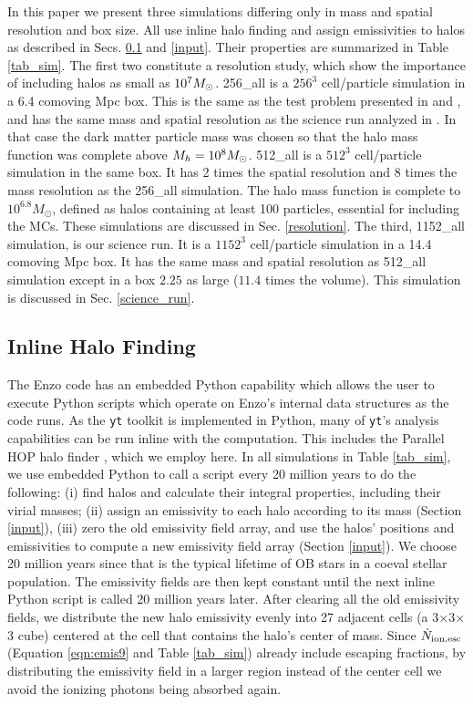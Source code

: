 \documentclass[iop,apj]{emulateapj}
\begin{document}
In this paper we present three simulations differing only in mass and spatial resolution and box size. All use inline halo finding and assign emissivities to halos as described in Secs. \ref{halofinding} and \ref{input}. Their properties are summarized in Table \ref{tab_sim}. The first two constitute a resolution study, which show the importance of including halos as small as $10^7\Ms$. 256\_all is a $256^3$ cell/particle simulation in a 6.4 comoving Mpc box. This is the same as the test problem presented in \cite{So14} and \cite{Norman13}, and has the same mass and spatial resolution as the science run analyzed in \cite{So14}. In that case the dark matter particle mass was chosen so that the halo mass function was complete above $\mh = 10^8 \Ms$. 512\_all is a $512^3$ cell/particle simulation in the same box. It has 2 times the spatial resolution and 8 times the mass resolution as the 256\_all simulation. The halo mass function is complete to $ 10^{6.8}M_{\odot}$, defined as halos containing at least 100 particles, essential for including the MCs. These simulations are discussed in Sec. \ref{resolution}. The third, 1152\_all simulation, is our science run. It is a $1152^3$ cell/particle simulation in a 14.4 comoving Mpc box. It has the same mass and spatial resolution as 512\_all simulation except in a box $2.25$ as large ($11.4$ times the volume). This simulation is discussed in Sec. \ref{science_run}. 

\subsection{Inline Halo Finding}\label{halofinding}
The Enzo code has an embedded Python capability which allows the user to execute Python scripts which operate on Enzo's internal data structures as the code runs. As the {\tt yt} toolkit \citep{yt_full_paper} is implemented in Python, many of {\tt yt}'s analysis capabilities can be run inline with the computation. This includes the Parallel HOP halo finder \citep{Skory10}, which we employ here. 
In all simulations in Table \ref{tab_sim}, we use embedded Python to call a script every 20 million years to do the following: (i) find halos and calculate their integral properties, including their virial masses;  (ii) assign an emissivity to each halo according to its mass (Section \ref{input}), (iii) zero the old emissivity field array, and use the halos' positions and emissivities to compute a new emissivity field array (Section \ref{input}). We choose 20 million years since that is the typical lifetime of OB stars in a coeval stellar population. The emissivity fields are then kept constant until the next inline Python script is called 20 million years later. After clearing all the old emissivity fields, we distribute the new halo emissivity evenly into 27 adjacent cells (a 3$\times$3$\times$3 cube) centered at the cell that contains the halo's center of mass. Since $\dot{N}_{\rm ion,esc}$ (Equation \ref{eqn:emis9} and Table \ref{tab_sim}) already include escaping fractions, by distributing the emissivity field in a larger region instead of the center cell we avoid the ionizing photons being absorbed again. 
\end{document}
